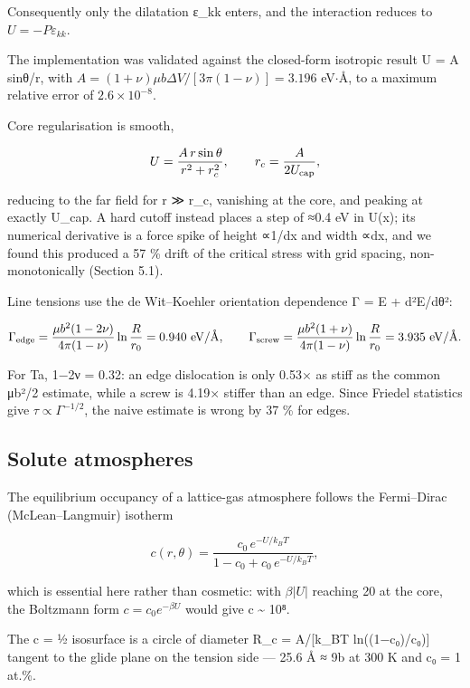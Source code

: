 Consequently only the dilatation ε\_kk enters, and the interaction reduces to \(U = -P\varepsilon_{kk}\).

The implementation was validated against the closed-form isotropic result U = A sinθ/r, with \(A = (1+\nu)\mu b\Delta V/[3\pi(1-\nu)] = 3.196\) eV\(\cdot\)\AA, to a maximum relative error of \textbf{\(2.6\times10^{-8}\)}.

Core regularisation is smooth,

\[U = \frac{A\,r\sin\theta}{r^2 + r_c^2},\qquad r_c = \frac{A}{2U_{\rm cap}},\]

reducing to the far field for r ≫ r\_c, vanishing at the core, and peaking at exactly U\_cap. A hard cutoff instead places a step of ≈0.4 eV in U(x); its numerical derivative is a force spike of height ∝1/dx and width ∝dx, and we found this produced a 57 \% drift of the critical stress with grid spacing, non-monotonically (Section 5.1).

Line tensions use the de Wit--Koehler orientation dependence \cite{dewit1959} Γ = E + d²E/dθ²:

\[\Gamma_{\rm edge} = \frac{\mu b^2(1-2\nu)}{4\pi(1-\nu)}\ln\frac{R}{r_0} = 0.940\ \text{eV/\AA},\qquad \Gamma_{\rm screw} = \frac{\mu b^2(1+\nu)}{4\pi(1-\nu)}\ln\frac{R}{r_0} = 3.935\ \text{eV/\AA}.\]

For Ta, 1−2ν = 0.32: an edge dislocation is only 0.53× as stiff as the common μb²/2 estimate, while a screw is 4.19× stiffer than an edge. Since Friedel statistics \cite{friedel1964} give \(\tau \propto \Gamma^{-1/2}\), the naive estimate is wrong by 37 \% for edges.

\hypertarget{solute-atmospheres}{%
\subsection{Solute atmospheres}\label{sec:solute-atmospheres}}

The equilibrium occupancy of a lattice-gas atmosphere follows the Fermi--Dirac (McLean--Langmuir) isotherm

\[c(r,\theta) = \frac{c_0\,e^{-U/k_BT}}{1 - c_0 + c_0\,e^{-U/k_BT}},\]

which is essential here rather than cosmetic: with \(\beta|U|\) reaching 20 at the core, the Boltzmann form \(c = c_0 e^{-\beta U}\) would give c \textasciitilde{} 10⁸.

The c = ½ isosurface is a circle of diameter R\_c = A/{[}k\_BT ln((1−c₀)/c₀){]} tangent to the glide plane on the tension side --- 25.6 Å ≈ 9b at 300 K and c₀ = 1 at.\%.

